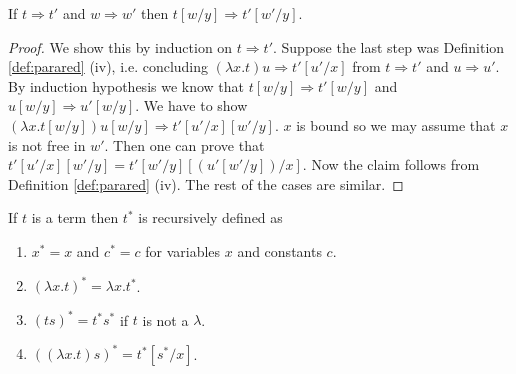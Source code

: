 \begin{boxlem} \label{lem:arrowsubst}
    If $t \Rightarrow t'$ and $w \Rightarrow w'$ then $t[w/y] \Rightarrow t'[w'/y]$.
\end{boxlem}
\begin{proof}
    We show this by induction on $t \Rightarrow t'$.
    Suppose the last step was Definition \ref{def:parared} (iv), i.e. concluding $(\lambda x.t)u \Rightarrow t'[u'/x]$ from $t \Rightarrow t'$ and $u \Rightarrow u'$.
    By induction hypothesis we know that $t[w/y] \Rightarrow t'[w/y]$ and $u[w /y] \Rightarrow u'[w/y]$.
    We have to show $(\lambda x.t [w/y])u[w/y] \Rightarrow t'[u'/x][w'/y]$.
    $x$ is bound so we may assume that $x$ is not free in $w'$. 
    Then one can prove that $t'[u'/x][w'/y] = t'[w'/y][(u'[w'/y])/x]$.
    Now the claim follows from Definition \ref{def:parared} (iv).
    The rest of the cases are similar.
\end{proof}

\begin{boxdefi} \label{def:star}
    If $t$ is a term then \alert{$t^*$} is recursively defined as 
    \begin{enumerate}
        \item $x^* = x$ and $c^* = c$ for variables $x$ and constants $c$.
        \item $(\lambda x.t)^* = \lambda x. t^*$.
        \item $(ts)^* = t^*s^*$ if $t$ is not a $\lambda$.
        \item $((\lambda x.t) s)^* = t^*[s^*/x]$.
    \end{enumerate}
\end{boxdefi}

